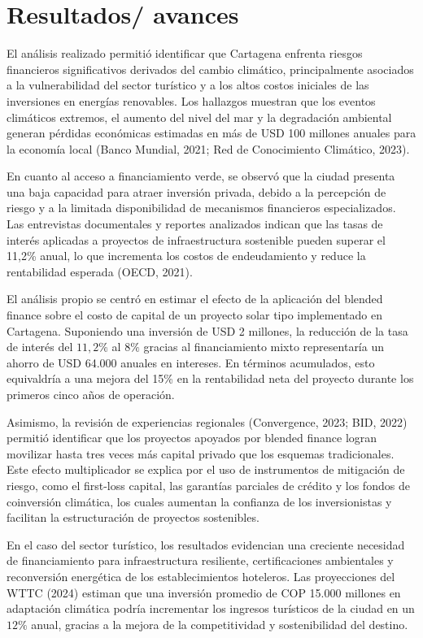 \section{Resultados/ avances}

El análisis realizado permitió identificar que Cartagena enfrenta riesgos financieros significativos derivados del cambio climático, principalmente asociados a la vulnerabilidad del sector turístico y a los altos costos iniciales de las inversiones en energías renovables. Los hallazgos muestran que los eventos climáticos extremos, el aumento del nivel del mar y la degradación ambiental generan pérdidas económicas estimadas en más de USD 100 millones anuales para la economía local (Banco Mundial, 2021; Red de Conocimiento Climático, 2023).

En cuanto al acceso a financiamiento verde, se observó que la ciudad presenta una baja capacidad para atraer inversión privada, debido a la percepción de riesgo y a la limitada disponibilidad de mecanismos financieros especializados. Las entrevistas documentales y reportes analizados indican que las tasas de interés aplicadas a proyectos de infraestructura sostenible pueden superar el 11,2\% anual, lo que incrementa los costos de endeudamiento y reduce la rentabilidad esperada (OECD, 2021).

El análisis propio se centró en estimar el efecto de la aplicación del blended finance sobre el costo de capital de un proyecto solar tipo implementado en Cartagena. Suponiendo una inversión de USD 2 millones, la reducción de la tasa de interés del $11,2\%$ al $8\%$ gracias al financiamiento mixto representaría un ahorro de USD 64.000 anuales en intereses. En términos acumulados, esto equivaldría a una mejora del 15\% en la rentabilidad neta del proyecto durante los primeros cinco años de operación.

Asimismo, la revisión de experiencias regionales (Convergence, 2023; BID, 2022) permitió identificar que los proyectos apoyados por blended finance logran movilizar hasta tres veces más capital privado que los esquemas tradicionales. Este efecto multiplicador se explica por el uso de instrumentos de mitigación de riesgo, como el first-loss capital, las garantías parciales de crédito y los fondos de coinversión climática, los cuales aumentan la confianza de los inversionistas y facilitan la estructuración de proyectos sostenibles.

En el caso del sector turístico, los resultados evidencian una creciente necesidad de financiamiento para infraestructura resiliente, certificaciones ambientales y reconversión energética de los establecimientos hoteleros. Las proyecciones del WTTC (2024) estiman que una inversión promedio de COP 15.000 millones en adaptación climática podría incrementar los ingresos turísticos de la ciudad en un $12\%$ anual, gracias a la mejora de la competitividad y sostenibilidad del destino.

